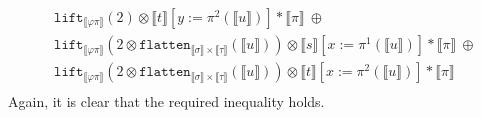 \documentclass[runningheads,a4paper]{llncs}
\newcommand{\typeinterpret}[1]{\llbracket #1 \rrbracket}
\newcommand{\interpret}[1]{\llbracket #1 \rrbracket}
\newcommand{\flatten}{\mathtt{flatten}}
\newcommand{\lift}{\mathtt{lift}}
\begin{document}
\begin{itemize}
\[\begin{array}{l}
  \phantom{A}
  \lift_{\typeinterpret{\varphi\pi}}(2) \otimes
    \interpret{t}[y:=\pi^2(\interpret{u})] * \typeinterpret{\pi}\ \oplus\\
  \phantom{A}
  \lift_{\typeinterpret{\varphi\pi}}(2 \otimes
    \flatten_{\typeinterpret{\sigma} \times \typeinterpret{\tau}}(
      \interpret{u})) \otimes \interpret{s}[x:=\pi^1(\interpret{u})]
      * \typeinterpret{\pi}\ \oplus \\
  \phantom{A}
  \lift_{\typeinterpret{\varphi\pi}}(2 \otimes
    \flatten_{\typeinterpret{\sigma} \times \typeinterpret{\tau}}(
      \interpret{u})) \otimes \interpret{t}[x:=\pi^2(\interpret{u})]
      * \typeinterpret{\pi} \\
  \end{array}
  \]
  Again, it is clear that the required inequality holds.


\end{itemize}
\end{document}
